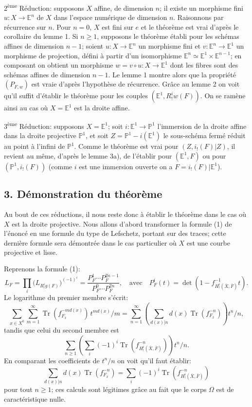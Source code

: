 \documentclass[11pt]{article}
\providecommand{\Tr}{\operatorname{Tr}}
\providecommand{\Tr}{\operatorname{Tr}}
\providecommand{\Tr}{\operatorname{Tr}}
\providecommand{\Tr}{\operatorname{Tr}}
\providecommand{\Tr}{\operatorname{Tr}}
\begin{document}
2\textsuperscript{ème} Réduction: supposons $X$ affine, de dimension $n$; il existe un morphisme fini $u:X\to\mathbb E^n$ de $X$ dans l'espace numérique de dimension $n$. Raisonnons par récurrence sur $n$. Pour $n=0$, $X$ est fini sur $e$ et le théorème est vrai d'après le corollaire du lemme 1. Si $n\ge1$, supposons le théorème établi pour les schémas affines de dimension $n-1$; soient $u:X\to\mathbb E^n$ un morphisme fini et $v:\mathbb E^n\to\mathbb E^1$ un morphisme de projection, défini à partir d'un isomorphisme $\mathbb E^n\simeq\mathbb E^1\times\mathbb E^{n-1}$; en composant on obtient un morphisme $w=v\circ u:X\to\mathbb E^1$ dont les fibres sont des schémas affines de dimension $n-1$. Le lemme 1 montre alors que la propriété $(P_{F,w})$ est vraie d'après l'hypothèse de récurrence. Grâce au lemme 2 on voit qu'il suffit d'établir le théorème pour les couples $(\mathbb E^1,R^i_!w(F))$. On se ramène ainsi au cas où $X=\mathbb E^1$ est la droite affine.

3\textsuperscript{ème} Réduction: supposons $X=\mathbb E^1$; soit $i:\mathbb E^1\to\mathbb P^1$ l'immersion de la droite affine dans la droite projective $\mathbb P^1$, et soit $Z=\mathbb P^1-i(\mathbb E^1)$ le sous-schéma fermé réduit au point à l'infini de $\mathbb P^1$. Comme le théorème est vrai pour $(Z,i_!(F)|Z)$, il revient au même, d'après le lemme 3a), de l'établir pour $(\mathbb E^1,F)$ ou pour $(\mathbb P^1,i_!(F))$ (comme $i$ est une immersion ouverte on a $F=i_!(F)|\mathbb E^1$).

\subsection*{3. Démonstration du théorème}

Au bout de ces réductions, il nous reste donc à établir le théorème dans le cas où $X$ est la droite projective. Nous allons d'abord transformer la formule (1) de l'énoncé en une formule du type de Lefschetz, portant sur des traces; cette dernière formule sera démontrée dans le cas particulier où $X$ est une courbe projective et lisse.

Reprenons la formule (1):
\[
L_F=\prod_i\bigl(L_{R^i_!g(F)}\bigr)^{(-1)^i}
=\frac{P_F^1\cdots P_F^{2n-1}}{P_F^0\cdots P_F^{2n}},
\quad\text{avec}\quad
P_F^i(t)=\det(1-f^{-1}_{H^i_!(\bar X,\bar F)}t).
\]
Le logarithme du premier membre s'écrit:
\[
\sum_{x\in X^0}\sum_{m=1}^{\infty}\Tr(f_{F_{\bar x}}^{-m d(x)})\,t^{m d(x)}/m
=\sum_{n=1}^{\infty}\left(\sum_{d(x)|n} d(x)\Tr(f_{F_{\bar x}}^{-n})\right)t^n/n,
\]
tandis que celui du second membre est
\[
\sum_{n\ge1}\left(\sum_i(-1)^i\Tr(f^{-n}_{H^i_!(\bar X,\bar F)})\right)t^n/n.
\]
En comparant les coefficients de $t^n/n$ on voit qu'il faut établir:
\[
\sum_{d(x)|n}d(x)\Tr(f_{F_{\bar x}}^{-n})
=\sum_i(-1)^i\Tr(f^{-n}_{H^i_!(\bar X,\bar F)})
\tag{2}
\]
pour tout $n\ge1$; ces calculs sont légitimes grâce au fait que le corps $\Omega$ est de caractéristique nulle.
\end{document}
